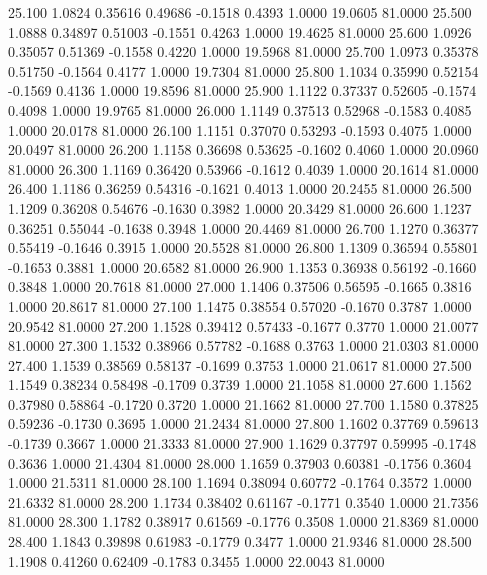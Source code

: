   25.100   1.0824   0.35616   0.49686  -0.1518   0.4393   1.0000  19.0605  81.0000
  25.500   1.0888   0.34897   0.51003  -0.1551   0.4263   1.0000  19.4625  81.0000
  25.600   1.0926   0.35057   0.51369  -0.1558   0.4220   1.0000  19.5968  81.0000
  25.700   1.0973   0.35378   0.51750  -0.1564   0.4177   1.0000  19.7304  81.0000
  25.800   1.1034   0.35990   0.52154  -0.1569   0.4136   1.0000  19.8596  81.0000
  25.900   1.1122   0.37337   0.52605  -0.1574   0.4098   1.0000  19.9765  81.0000
  26.000   1.1149   0.37513   0.52968  -0.1583   0.4085   1.0000  20.0178  81.0000
  26.100   1.1151   0.37070   0.53293  -0.1593   0.4075   1.0000  20.0497  81.0000
  26.200   1.1158   0.36698   0.53625  -0.1602   0.4060   1.0000  20.0960  81.0000
  26.300   1.1169   0.36420   0.53966  -0.1612   0.4039   1.0000  20.1614  81.0000
  26.400   1.1186   0.36259   0.54316  -0.1621   0.4013   1.0000  20.2455  81.0000
  26.500   1.1209   0.36208   0.54676  -0.1630   0.3982   1.0000  20.3429  81.0000
  26.600   1.1237   0.36251   0.55044  -0.1638   0.3948   1.0000  20.4469  81.0000
  26.700   1.1270   0.36377   0.55419  -0.1646   0.3915   1.0000  20.5528  81.0000
  26.800   1.1309   0.36594   0.55801  -0.1653   0.3881   1.0000  20.6582  81.0000
  26.900   1.1353   0.36938   0.56192  -0.1660   0.3848   1.0000  20.7618  81.0000
  27.000   1.1406   0.37506   0.56595  -0.1665   0.3816   1.0000  20.8617  81.0000
  27.100   1.1475   0.38554   0.57020  -0.1670   0.3787   1.0000  20.9542  81.0000
  27.200   1.1528   0.39412   0.57433  -0.1677   0.3770   1.0000  21.0077  81.0000
  27.300   1.1532   0.38966   0.57782  -0.1688   0.3763   1.0000  21.0303  81.0000
  27.400   1.1539   0.38569   0.58137  -0.1699   0.3753   1.0000  21.0617  81.0000
  27.500   1.1549   0.38234   0.58498  -0.1709   0.3739   1.0000  21.1058  81.0000
  27.600   1.1562   0.37980   0.58864  -0.1720   0.3720   1.0000  21.1662  81.0000
  27.700   1.1580   0.37825   0.59236  -0.1730   0.3695   1.0000  21.2434  81.0000
  27.800   1.1602   0.37769   0.59613  -0.1739   0.3667   1.0000  21.3333  81.0000
  27.900   1.1629   0.37797   0.59995  -0.1748   0.3636   1.0000  21.4304  81.0000
  28.000   1.1659   0.37903   0.60381  -0.1756   0.3604   1.0000  21.5311  81.0000
  28.100   1.1694   0.38094   0.60772  -0.1764   0.3572   1.0000  21.6332  81.0000
  28.200   1.1734   0.38402   0.61167  -0.1771   0.3540   1.0000  21.7356  81.0000
  28.300   1.1782   0.38917   0.61569  -0.1776   0.3508   1.0000  21.8369  81.0000
  28.400   1.1843   0.39898   0.61983  -0.1779   0.3477   1.0000  21.9346  81.0000
  28.500   1.1908   0.41260   0.62409  -0.1783   0.3455   1.0000  22.0043  81.0000
